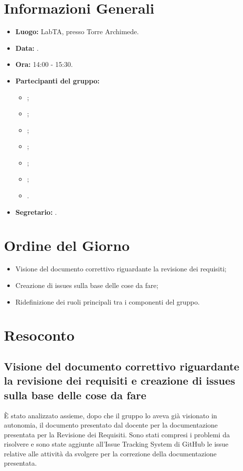 \section{Informazioni Generali}
\begin{itemize}
\item \textbf{Luogo:} LabTA, presso Torre Archimede.
\item \textbf{Data:} \Data.
\item \textbf{Ora:} 14:00 - 15:30.
\item \textbf{Partecipanti del gruppo:}
	\begin{itemize}
		\item \AT{}; 
		\item \BR{};
		\item \CE{}; 
		\item \LD{};
		\item \MC{};
		\item \PF{};
		\item \SE{}.
	\end{itemize} 
\item \textbf{Segretario:} \CE{}.
\end{itemize}

\section{Ordine del Giorno}
\begin{itemize}
	\item Visione del documento correttivo riguardante la revisione dei requisiti;
	\item Creazione di issues sulla base delle cose da fare;
	\item Ridefinizione dei ruoli principali tra i componenti del gruppo.
\end{itemize}


\section{Resoconto}

\subsection{Visione del documento correttivo riguardante la revisione dei requisiti e creazione di issues sulla base delle cose da fare}
È stato analizzato assieme, dopo che il gruppo lo aveva già visionato in autonomia, il documento presentato dal docente per la documentazione presentata per la Revisione dei Requisiti.
Sono stati compresi i problemi da risolvere e sono state aggiunte all'Issue Tracking System di GitHub le issue relative alle attività da svolgere per la correzione della documentazione presentata.

